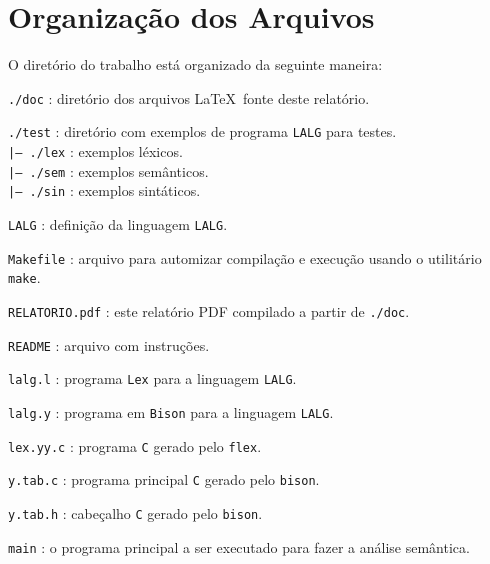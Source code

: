\clearpage
\section{Organização dos Arquivos \label{sec:organizacao-dos-arquivos}}

O diretório do trabalho está organizado da seguinte maneira:

\indent\indent\texttt{./doc} : diretório dos arquivos \LaTeX~fonte deste relatório.

\indent\indent\texttt{./test} : diretório com exemplos de programa \texttt{LALG} para testes.\\
\indent\indent\indent\texttt{|-- ./lex} : exemplos léxicos.\\
\indent\indent\indent\texttt{|-- ./sem} : exemplos semânticos.\\
\indent\indent\indent\texttt{|-- ./sin} : exemplos sintáticos.

\indent\indent\texttt{\texttt{LALG}} : definição da linguagem \texttt{LALG}.

\indent\indent\texttt{Makefile} : arquivo para automizar compilação e execução usando o utilitário \texttt{make}.

\indent\indent\texttt{RELATORIO.pdf} : este relatório PDF compilado a partir de \texttt{./doc}.

\indent\indent\texttt{README} : arquivo com instruções.

\indent\indent\texttt{lalg.l} : programa \texttt{Lex} para a linguagem \texttt{LALG}.

\indent\indent\texttt{lalg.y} : programa em \texttt{Bison} para a linguagem \texttt{LALG}.

\indent\indent\texttt{lex.yy.c} : programa \texttt{C} gerado pelo \texttt{flex}.

\indent\indent\texttt{y.tab.c} : programa principal \texttt{C} gerado pelo \texttt{bison}.

\indent\indent\texttt{y.tab.h} : cabeçalho \texttt{C} gerado pelo \texttt{bison}.

\indent\indent\texttt{main} : o programa principal a ser executado para fazer a análise semântica.